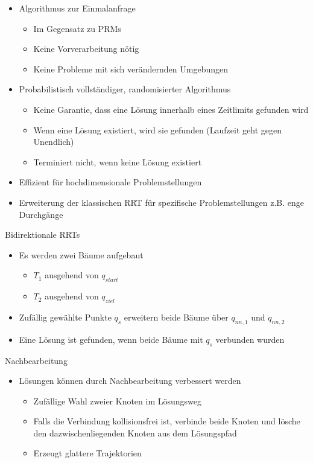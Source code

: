 \documentclass[paper=a4, fontsize=11pt]{scrartcl} %
\numberwithin{equation}{section} %
\numberwithin{figure}{section} %
\numberwithin{table}{section} %
\begin{document}
\begin{itemize}
\item Algorithmus zur Einmalanfrage
\begin{itemize}
\item Im Gegensatz zu PRMs
\item Keine Vorverarbeitung nötig
\item Keine Probleme mit sich verändernden Umgebungen
\end{itemize}
\item Probabilistisch vollständiger, randomisierter Algorithmus
\begin{itemize}
\item Keine Garantie, dass eine Lösung innerhalb eines Zeitlimits gefunden wird
\item Wenn eine Lösung existiert, wird sie gefunden (Laufzeit geht gegen Unendlich)
\item Terminiert nicht, wenn keine Lösung existiert
\end{itemize}
\item Effizient für hochdimensionale Problemstellungen
\item Erweiterung der klassischen RRT für spezifische Problemstellungen z.B. enge Durchgänge
\end{itemize}

Bidirektionale RRTs
\begin{itemize}
\item Es werden zwei Bäume aufgebaut
\begin{itemize}
\item $T_1$ ausgehend von $q_{start}$
\item $T_2$ ausgehend von $q_{ziel}$
\end{itemize}
\item Zufällig gewählte Punkte $q_s$ erweitern beide Bäume über $q_{nn,1}$ und $q_{nn,2}$
\item Eine Lösung ist gefunden, wenn beide Bäume mit $q_s$ verbunden wurden
\end{itemize}

Nachbearbeitung
\begin{itemize}
\item Lösungen können durch Nachbearbeitung verbessert werden
\begin{itemize}
\item Zufällige Wahl zweier Knoten im Lösungsweg
\item Falls die Verbindung kollisionsfrei ist, verbinde beide Knoten und lösche den dazwischenliegenden Knoten aus dem Lösungspfad
\item Erzeugt glattere Trajektorien
\end{itemize}
\end{itemize}
\end{document}
